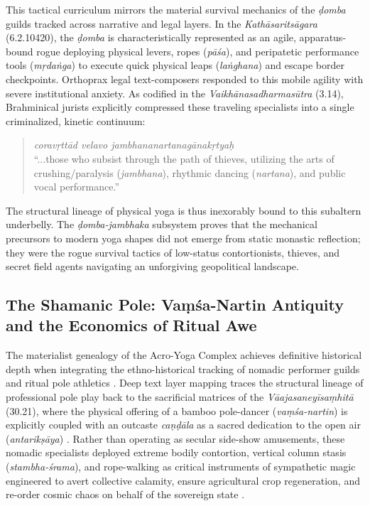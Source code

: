 \documentclass[11pt,letterpaper]{article}
\begin{document}
This tactical curriculum mirrors the material survival mechanics of the \textit{ḍomba} guilds tracked across narrative and legal layers. In the \textit{Kathāsaritsāgara} (6.2.10420), the \textit{ḍomba} is characteristically represented as an agile, apparatus-bound rogue deploying physical levers, ropes (\textit{pāśa}), and peripatetic performance tools (\textit{mṛdaṅga}) to execute quick physical leaps (\textit{laṅghana}) and escape border checkpoints. Orthoprax legal text-composers responded to this mobile agility with severe institutional anxiety. As codified in the \textit{Vaikhānasadharmasūtra} (3.14), Brahminical jurists explicitly compressed these traveling specialists into a single criminalized, kinetic continuum:
\begin{quote}
    \textit{coravṛttād velavo jambhananartanagānakṛtyaḥ} \cite{VaikhDhS} \\
    ``...those who subsist through the path of thieves, utilizing the arts of crushing/paralysis (\textit{jambhana}), rhythmic dancing (\textit{nartana}), and public vocal performance.'' \cite{VaikhDhS}
\end{quote}
The structural lineage of physical yoga is thus inexorably bound to this subaltern underbelly. The \textit{ḍomba-jambhaka} subsystem proves that the mechanical precursors to modern yoga shapes did not emerge from static monastic reflection; they were the rogue survival tactics of low-status contortionists, thieves, and secret field agents navigating an unforgiving geopolitical landscape.

\subsection{The Shamanic Pole: Vaṃśa-Nartin Antiquity and the Economics of Ritual Awe}

The materialist genealogy of the Acro-Yoga Complex achieves definitive historical depth when integrating the ethno-historical tracking of nomadic performer guilds and ritual pole athletics \cite{McCartney2026c}. Deep text layer mapping traces the structural lineage of professional pole play back to the sacrificial matrices of the \textit{Vāajasaneyīsaṃhitā} (30.21), where the physical offering of a bamboo pole-dancer (\textit{vaṃśa-nartin}) is explicitly coupled with an outcaste \textit{caṇḍāla} as a sacred dedication to the open air (\textit{antarikṣāya}) \cite{McCartney2026c}. Rather than operating as secular side-show amusements, these nomadic specialists deployed extreme bodily contortion, vertical column stasis (\textit{stambha-śrama}), and rope-walking as critical instruments of sympathetic magic engineered to avert collective calamity, ensure agricultural crop regeneration, and re-order cosmic chaos on behalf of the sovereign state \cite{McCartney2026c}. 
\end{document}
